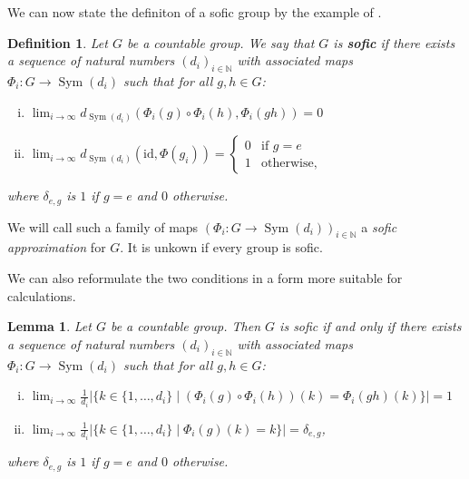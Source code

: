 \documentclass[titlepage, a4paper]{article}
\newcommand{\N}{\mathbb{N}}
\newcommand{\card}[1]{\left| #1 \right|}
\newcommand{\id}{\mathrm{id}}
\DeclareMathOperator{\sym}{Sym}
\newtheorem{definition}[theorem]{Definition}
\newtheorem{lemma}[theorem]{Lemma}
\theoremstyle{remark}
\begin{document}
We can now state the definiton of a sofic group by the example of \cite{capraro_lupini_2015}.

\begin{definition}\label{def:Sofic}  %
        Let $G$ be a countable group. We say that $G$ is \textbf{sofic} if there exists a sequence of natural numbers $(d_i)_{i \in \N}$ with associated maps $\Phi_i : G \to \sym(d_i)$ such that for all $g, h \in G$:
        \begin{enumerate}[(i)]
            \item $ \displaystyle \lim_{i \to \infty} d_{\sym(d_i)}(\Phi_i(g) \circ \Phi_i(h), \Phi_i(gh)) = 0$
            \item $ \displaystyle \lim_{i \to \infty} d_{\sym(d_i)}(\id,\Phi(g_i)) = \begin{cases}  0 & \text{if } g = e \\
                                                                                    1 & \text{otherwise,}
                                                                                    \end{cases}$
        \end{enumerate}
        where $\delta_{e,g}$ is $1$ if $g = e$ and $0$ otherwise.
    \end{definition}

    We will call such a family of maps $\left(\Phi_i : G \to \sym(d_i) \right)_{i \in \N}$ %
    a \emph{sofic approximation} for $G$. It is unkown if every group is sofic.

    We can also reformulate the two conditions in a form more suitable for calculations.
     \begin{lemma}\label{def:Sofic}
        Let $G$ be a countable group. Then $G$ is sofic if and only if there exists a sequence of natural numbers $(d_i)_{i \in \N}$ with associated maps $\Phi_i : G \to \sym(d_i)$ such that for all $g, h \in G$:
        \begin{enumerate}[(i)]
            \item $\displaystyle \lim_{i\to \infty} \frac{1}{d_i} \card{\big\{k \in \{1, \dots, d_i\} \mid (\Phi_i(g) \circ \Phi_i(h))(k) = \Phi_i(gh) (k) \big\}} = 1$
            \item $\displaystyle \lim_{i\to \infty} \frac{1}{d_i}  \card{\big\{k \in \{1, \dots, d_i\} \mid \Phi_i(g)(k) = k \big\}} = \delta_{e,g}$,
        \end{enumerate}
        where $\delta_{e,g}$ is $1$ if $g = e$ and $0$ otherwise.
    \end{lemma}
\end{document}
